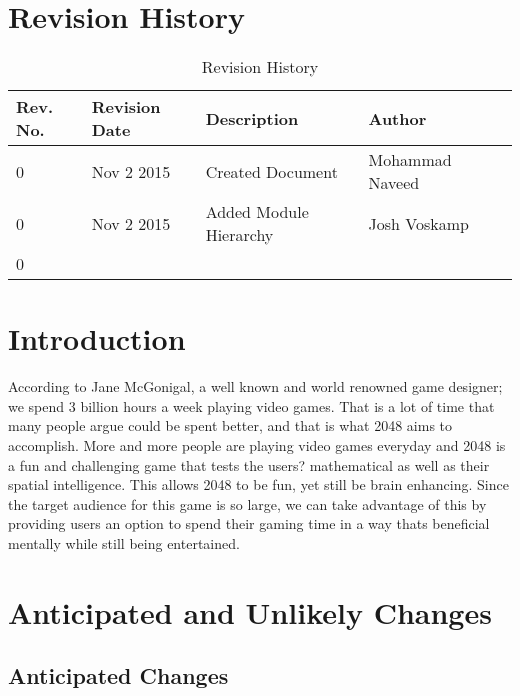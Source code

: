 \documentclass[12pt]{article}
\begin{document}
\newpage
\tableofcontents
\newpage
\listoftables
{}
\newpage
\listoffigures
{}
\newpage

\section*{Revision History}
\begin{table}[!htbp]
	\centering
	\begin{tabular}{ | p{2cm} | l| l | l |p{3cm}|}
		\hline
		Rev. No. & Revision Date & Description & Author \\\hline
		0 & Nov 2 2015 & Created Document & Mohammad Naveed \\\hline
		0 & Nov 2 2015 & Added Module Hierarchy & Josh Voskamp \\\hline
		0 &  &  &  \\ \hline
		
	\end{tabular}
	\caption{Revision History}
\end{table}
\newpage

\section{Introduction}
According to Jane McGonigal, a well known and world renowned game 
designer; we 
spend 3 billion hours a week playing video games. That is a lot of 
time that 
many people argue could be spent better, and that is what 2048 aims to 
accomplish. More and more people are playing video games everyday and 
2048 is a 
fun and challenging game that tests the users? mathematical as well as 
their 
spatial intelligence. This allows 2048 to be fun, yet still be brain 
enhancing. 
Since the target audience for this game is so large, we can take 
advantage of 
this by providing users an option to spend their gaming time in a way 
thats 
beneficial mentally while still being entertained.

\section{Anticipated and Unlikely Changes}

\subsection{Anticipated Changes}
\end{document}
